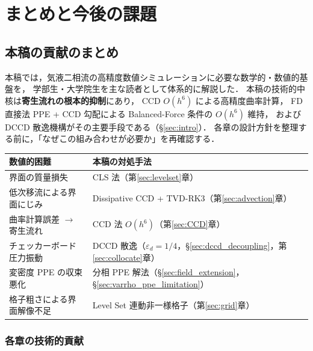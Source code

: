 \section{まとめと今後の課題}
\label{sec:conclusion}

\subsection{本稿の貢献のまとめ}
\label{sec:contribution_summary}

本稿では，気液二相流の高精度数値シミュレーションに必要な数学的・数値的基盤を，
学部生・大学院生を主な読者として体系的に解説した．
本稿の技術的中核は\textbf{寄生流れの根本的抑制}にあり，
CCD $O(h^6)$ による高精度曲率計算，
FD 直接法 PPE + CCD 勾配による Balanced-Force 条件の $O(h^6)$ 維持，
および DCCD 散逸機構がその主要手段である（§\ref{sec:intro}）．
各章の設計方針を整理する前に，「なぜこの組み合わせが必要か」を再確認する．

\begin{center}
\renewcommand{\arraystretch}{1.4}
\begin{tabular}{>{\raggedright}p{60mm}>{\raggedright\arraybackslash}p{70mm}}
\hline
\textbf{数値的困難} & \textbf{本稿の対処手法} \\
\hline
界面の質量損失       & CLS 法（第\ref{sec:levelset}章）\\
低次移流による界面にじみ & Dissipative CCD + TVD-RK3（第\ref{sec:advection}章）\\
曲率計算誤差 $\to$ 寄生流れ & CCD 法 $O(h^6)$（第\ref{sec:CCD}章）\\
チェッカーボード圧力振動 & DCCD 散逸（$\varepsilon_d=1/4$，§\ref{sec:dccd_decoupling}，第\ref{sec:collocate}章）\\
変密度 PPE の収束悪化 & 分相 PPE 解法（§\ref{sec:field_extension}，§\ref{sec:varrho_ppe_limitation}）\\
格子粗さによる界面解像不足 & Level Set 連動非一様格子（第\ref{sec:grid}章）\\
\hline
\end{tabular}
\end{center}

\subsubsection{各章の技術的貢献}

